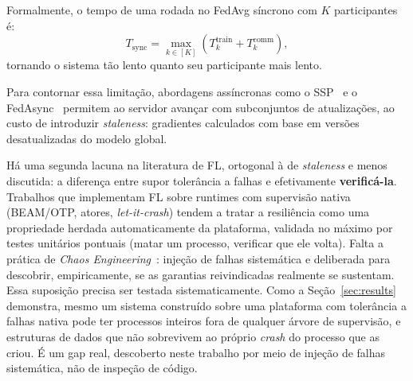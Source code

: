 \documentclass[conference,a4paper]{IEEEtran}
\begin{document}
Formalmente, o tempo de uma rodada no FedAvg síncrono com $K$ participantes é:
\begin{equation}
T_{\text{sync}} = \max_{k \in [K]}\left(T_k^{\text{train}} +
T_k^{\text{comm}}\right),
\label{eq:sync_round}
\end{equation}
tornando o sistema tão lento quanto seu participante mais lento.

Para contornar essa limitação, abordagens assíncronas como o SSP~\cite{ho2013}
e o FedAsync~\cite{xie2019} permitem ao servidor avançar com subconjuntos
de atualizações, ao custo de introduzir \textit{staleness}: gradientes
calculados com base em versões desatualizadas do modelo global.

Há uma segunda lacuna na literatura de FL, ortogonal à de
\textit{staleness} e menos discutida: a diferença entre supor tolerância
a falhas e efetivamente \textbf{verificá-la}. Trabalhos que implementam FL
sobre runtimes com supervisão nativa (BEAM/OTP, atores,
\textit{let-it-crash}) tendem a tratar a resiliência como uma propriedade
herdada automaticamente da plataforma, validada no máximo por testes
unitários pontuais (matar um processo, verificar que ele volta). Falta a
prática de \textit{Chaos Engineering}~\cite{basiri2016}: injeção de falhas
sistemática e deliberada para descobrir, empiricamente, se as garantias
reivindicadas realmente se sustentam. Essa suposição precisa ser testada
sistematicamente. Como a Seção~\ref{sec:results} demonstra, mesmo um
sistema construído sobre uma plataforma com tolerância a falhas nativa
pode ter processos inteiros fora de qualquer árvore de supervisão, e
estruturas de dados que não sobrevivem ao próprio \textit{crash} do
processo que as criou. É um gap real, descoberto neste trabalho por meio
de injeção de falhas sistemática, não de inspeção de código.
\end{document}
